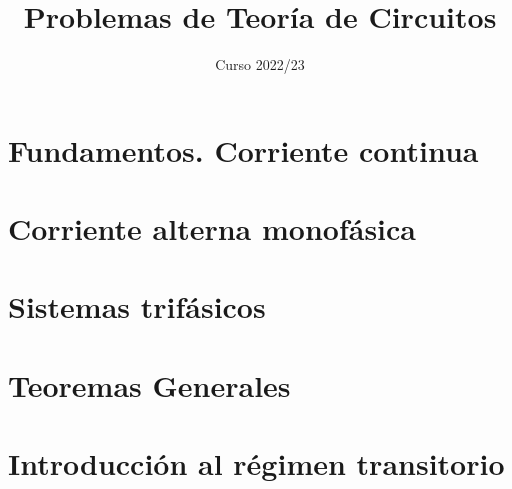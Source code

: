 \documentclass[oldfontcommands,a4paper]{memoir}
\begin{document}
\begin{titlingpage}

\title{Problemas de Teoría de Circuitos}

\author{}

\date{Curso 2022/23}

\maketitle


\end{titlingpage}

\frontmatter

\cleardoublepage{}

\tableofcontents*

\cleardoublepage{}

\mainmatter

\chapter{Fundamentos. Corriente continua}



\chapter{Corriente alterna monofásica}



\chapter{Sistemas trifásicos}



\chapter{Teoremas Generales}



\chapter{Introducción al régimen transitorio}




\backmatter
\end{document}
